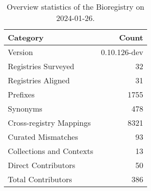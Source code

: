\begin{table}
\caption{Overview statistics of the Bioregistry on 2024-01-26.}
\label{tab:bioregistry-summary}
\begin{tabular}{lr}
\toprule
Category & Count \\
\midrule
Version & 0.10.126-dev \\
Registries Surveyed & 32 \\
Registries Aligned & 31 \\
Prefixes & 1755 \\
Synonyms & 478 \\
Cross-registry Mappings & 8321 \\
Curated Mismatches & 93 \\
Collections and Contexts & 13 \\
Direct Contributors & 50 \\
Total Contributors & 386 \\
\bottomrule
\end{tabular}
\end{table}
